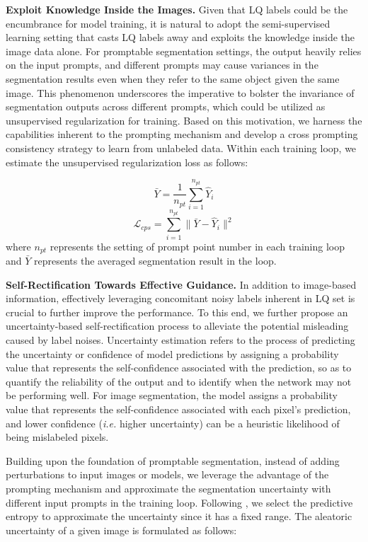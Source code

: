 \textbf{Exploit Knowledge Inside the Images.}
Given that LQ labels could be the encumbrance for model training, it is natural to adopt the semi-supervised learning setting that casts LQ labels away and exploits the knowledge inside the image data alone.
For promptable segmentation settings, the output heavily relies on the input prompts, and different prompts may cause variances in the segmentation results even when they refer to the same object given the same image. 
This phenomenon underscores the imperative to bolster the invariance of segmentation outputs across different prompts, which could be utilized as unsupervised regularization for training.
Based on this motivation, we harness the capabilities inherent to the prompting mechanism and develop a cross prompting consistency strategy to learn from unlabeled data.
Within each training loop, we estimate the unsupervised regularization loss as follows:

\begin{equation}
\bar Y = \frac{1}{n_{pt}}\sum\limits_{i = 1}^{n_{pt}} \hat Y_{i} 
\end{equation}
\begin{equation}
\mathcal{L}_{cps} = \sum_{i=1}^{n_{pt}} \| \bar Y - \hat Y_{i} \| ^{2}
\label{cps}
\end{equation}
where $n_{pt}$ represents the setting of prompt point number in each training loop and $\bar Y$ represents the averaged segmentation result in the loop.



\textbf{Self-Rectification Towards Effective Guidance.}
In addition to image-based information, effectively leveraging concomitant noisy labels inherent in LQ set is crucial to further improve the performance. To this end, we further propose an uncertainty-based self-rectification process to alleviate the potential misleading caused by label noises.
Uncertainty estimation refers to the process of predicting the uncertainty or confidence of model predictions by assigning a probability value that represents the self-confidence associated with the prediction, so as to quantify the reliability of the output and to identify when the network may not be performing well.
For image segmentation, the model assigns a probability value that represents the self-confidence associated with each pixel's prediction, and lower confidence (\textit{i.e.} higher uncertainty) can be a heuristic likelihood of being mislabeled pixels.

Building upon the foundation of promptable segmentation, instead of adding perturbations to input images or models, we leverage the advantage of the prompting mechanism and approximate the segmentation uncertainty with different input prompts in the training loop. Following \cite{zhang2023uncertainty}, we select the predictive entropy to approximate the uncertainty since it has a fixed range. The aleatoric uncertainty of a given image is formulated as follows:

